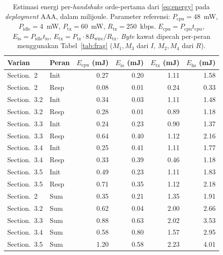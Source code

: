 \documentclass{easychair}
\newcommand{\VarSecShort}[1]{Section.~#1}
\begin{document}
\begin{table}[H]
\centering
\footnotesize
\caption{Estimasi energi per-\emph{handshake} orde-pertama dari
\eqref{eq:energy} pada \emph{deployment} AAA, dalam milijoule.
Parameter referensi: $P_{\mathrm{cpu}}\!=\!48$~mW, $P_{\mathrm{idle}}\!=\!4$~mW,
$P_{\mathrm{tx}}\!=\!60$~mW, $R_{\mathrm{tx}}\!=\!250$~kbps.
$E_{\mathrm{cpu}}\!=\!P_{\mathrm{cpu}} t_{\mathrm{cpu}}$,
$E_{\mathrm{io}}\!=\!P_{\mathrm{idle}} t_{\mathrm{io}}$,
$E_{\mathrm{tx}}\!=\!P_{\mathrm{tx}}\!\cdot\!8B_{\mathrm{wire}}/R_{\mathrm{tx}}$.
\emph{Byte} kawat dipecah per-peran menggunakan Tabel~\ref{tab:frag}
($M_1,M_3$ dari $I$, $M_2,M_4$ dari $R$).}
\label{tab:energy}
\begin{tabular}{llrrrr}
\toprule
\textbf{Varian} & \textbf{Peran} & $E_{\mathrm{cpu}}$ (mJ) & $E_{\mathrm{io}}$ (mJ) & $E_{\mathrm{tx}}$ (mJ) & $E_{\mathrm{hs}}$ (mJ) \\
\midrule
\VarSecShort{2}   & Init & 0.27 & 0.20 & 1.11 &  1.58 \\
\VarSecShort{2}   & Resp & 0.08 & 0.01 & 0.24 &  0.33 \\
\VarSecShort{3.2} & Init & 0.34 & 0.03 & 1.11 &  1.48 \\
\VarSecShort{3.2} & Resp & 0.28 & 0.01 & 0.89 &  1.18 \\
\VarSecShort{3.3} & Init & 0.24 & 0.23 & 0.90 &  1.37 \\
\VarSecShort{3.3} & Resp & 0.64 & 0.40 & 1.12 &  2.16 \\
\VarSecShort{3.4} & Init & 0.25 & 0.41 & 1.11 &  1.77 \\
\VarSecShort{3.4} & Resp & 0.33 & 0.39 & 0.46 &  1.18 \\
\VarSecShort{3.5} & Init & 0.49 & 0.23 & 1.11 &  1.83 \\
\VarSecShort{3.5} & Resp & 0.71 & 0.35 & 1.12 &  2.18 \\
\midrule
\VarSecShort{2}   & Sum  & 0.35 & 0.21 & 1.35 &  1.91 \\
\VarSecShort{3.2} & Sum  & 0.62 & 0.04 & 2.00 &  2.66 \\
\VarSecShort{3.3} & Sum  & 0.88 & 0.63 & 2.02 &  3.53 \\
\VarSecShort{3.4} & Sum  & 0.58 & 0.80 & 1.57 &  2.95 \\
\VarSecShort{3.5} & Sum  & 1.20 & 0.58 & 2.23 &  4.01 \\
\bottomrule
\end{tabular}
\end{table}
\end{document}
